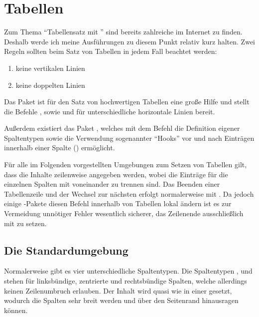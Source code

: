 \documentclass[%
  english,ngerman,%
  geometry=no,DIV=12,automark,%
]{tudscrartcl}
\begin{document}
\section{Tabellen}
\label{sec:tables}
Zum Thema \enquote{Tabellensatz mit } sind bereits zahlreiche 
 im 
Internet zu finden. Deshalb werde ich meine Ausführungen zu diesem Punkt 
relativ kurz halten. Zwei Regeln sollten beim Satz von Tabellen in jedem Fall 
beachtet werden:
%
\begin{enumerate}[itemindent=0pt,labelwidth=*,labelsep=1em,label=\Roman*.]
\item keine vertikalen Linien
\item keine doppelten Linien
\end{enumerate}
%
Das Paket  ist für den Satz von hochwertigen Tabellen eine 
große Hilfe und stellt die Befehle ,  sowie
 und  für unterschiedliche horizontale Linien 
bereit.
%
\begin{Preamble}
\usepackage{booktabs}
\end{Preamble}
%
Außerdem existiert das Paket , welches mit dem Befehl 
 die Definition eigener Spaltentypen sowie die Verwendung 
sogenannter \enquote{Hooks} vor und nach Einträgen innerhalb einer Spalte 
(\PValue{>\{\dots\}}\PValue{<\{\dots\}}) ermöglicht.
%
\begin{Preamble}
\usepackage{array}
\end{Preamble}
%
Für alle im Folgenden vorgestellten Umgebungen zum Setzen von Tabellen gilt, 
dass die Inhalte zeilenweise angegeben werden, wobei die Einträge für die 
einzelnen Spalten mit \PValue{\&} voneinander zu trennen sind. Das Beenden 
einer Tabellenzeile und der Wechsel zur nächsten erfolgt normalerweise mit 
\Macro{\bsc}. Da jedoch einige -Pakete diesen Befehl innerhalb 
von Tabellen lokal ändern ist es zur Vermeidung unnötiger Fehler wesentlich 
sicherer, das Zeilenende ausschließlich mit  zu setzen.


\subsection{Die Standardumgebung }
Normalerweise gibt es vier unterschiedliche Spaltentypen. Die Spaltentypen 
,  und  stehen für linksbündige, zentrierte und 
rechtsbündige Spalten, welche allerdings keinen Zeilenumbruch erlauben. Der 
Inhalt wird quasi wie in einer  gesetzt, wodurch die Spalten sehr 
breit werden und über den Seitenrand hinausragen können.
\end{document}
